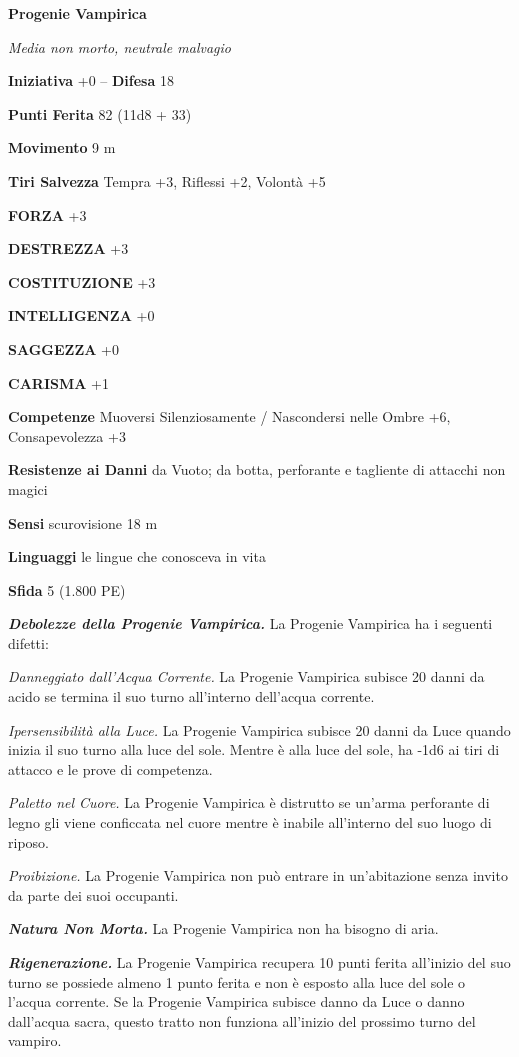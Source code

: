 \begin{multicols}{2}
\medskip{}\textbf{Progenie Vampirica}

\emph{Media non morto, neutrale malvagio}

\textbf{Iniziativa} +0 -- \textbf{Difesa} 18

\textbf{Punti Ferita} 82 (11d8 + 33)

\textbf{Movimento} 9 m

\textbf{Tiri Salvezza} Tempra +3, Riflessi +2, Volontà +5

\textbf{FORZA} +3

\textbf{DESTREZZA} +3

\textbf{COSTITUZIONE} +3

\textbf{INTELLIGENZA} +0

\textbf{SAGGEZZA} +0

\textbf{CARISMA} +1

\textbf{Competenze} Muoversi Silenziosamente / Nascondersi nelle Ombre +6, Consapevolezza +3

\textbf{Resistenze ai Danni} da Vuoto; da botta, perforante e tagliente di attacchi non magici

\textbf{Sensi} scurovisione 18 m

\textbf{Linguaggi} le lingue che conosceva in vita 

\textbf{Sfida} 5 (1.800 PE)

\emph{\textbf{Debolezze della Progenie Vampirica.}} La Progenie Vampirica ha i seguenti difetti:

\emph{Danneggiato dall'Acqua Corrente.} La Progenie Vampirica subisce 20 danni da acido se termina il suo turno all'interno dell'acqua corrente.

\emph{Ipersensibilità alla Luce.} La Progenie Vampirica subisce 20 danni da Luce quando inizia il suo turno alla luce del sole. Mentre è alla luce del sole, ha -1d6 ai tiri di attacco e le prove di competenza.

\emph{Paletto nel Cuore.} La Progenie Vampirica è distrutto se un'arma perforante di legno gli viene conficcata nel cuore mentre è inabile all'interno del suo luogo di riposo.

\emph{Proibizione.} La Progenie Vampirica non può entrare in un'abitazione senza invito da parte dei suoi occupanti.

\emph{\textbf{Natura Non Morta.}} La Progenie Vampirica non ha bisogno di aria.

\emph{\textbf{Rigenerazione.}} La Progenie Vampirica recupera 10 punti ferita all'inizio del suo turno se possiede almeno 1 punto ferita e non è esposto alla luce del sole o l'acqua corrente. Se la Progenie Vampirica subisce danno da Luce o danno dall'acqua sacra, questo tratto non funziona all'inizio del prossimo turno del vampiro.


\end{multicols}
